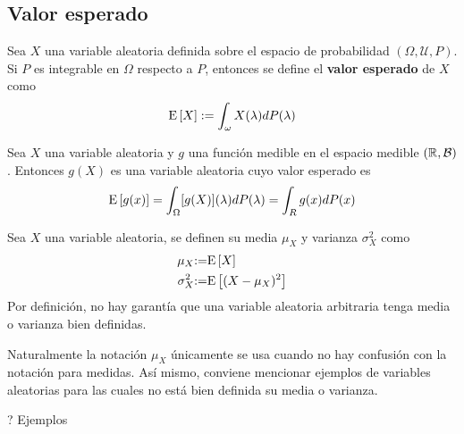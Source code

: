 

\subsection{Valor esperado}

\begin{definicion}
Sea $X$ una variable aleatoria definida sobre el espacio de probabilidad $(\Omega, \mathcal{U}, P)$. Si $P$ es integrable en $\Omega$ respecto a $P$, entonces se define el \textbf{valor esperado} de $X$ como
\begin{equation}
\mathrm{E}\left[ X \right] := \int_\omega X(\lambda) dP(\lambda)
\end{equation}
\end{definicion}

\begin{proposicion}
Sea $X$ una variable aleatoria y $g$ una función medible en el espacio medible $(\mathbb{R},\mathcal{B})$. Entonces $g(X)$ es una variable aleatoria cuyo valor esperado es
\begin{equation}
\mathrm{E}\left[ g(x) \right] = \int_\Omega [g(X)](\lambda) dP(\lambda) = \int_R g(x) dP(x)
\end{equation}
\end{proposicion}

\begin{definicion}
Sea $X$ una variable aleatoria, se definen su media $\mu_X$ y varianza $\sigma_X^{2}$ como
\begin{align}
\mu_X &{:=} \mathrm{E}\left[ X \right] \\
\sigma_X^{2} &{:=} \mathrm{E}\left[ (X-\mu_X)^{2} \right]
\end{align}
Por definición, no hay garantía que una variable aleatoria arbitraria tenga media o varianza bien definidas.
\end{definicion}

Naturalmente la notación $\mu_X$ únicamente se usa cuando no hay confusión con la notación para medidas. Así mismo, conviene mencionar ejemplos de variables aleatorias para las cuales no está bien definida su media o varianza.

? Ejemplos


